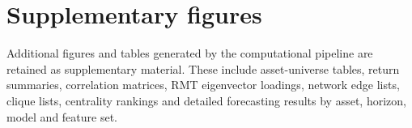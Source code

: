\section{Supplementary figures}
\label{app:supplementary_figures}


Additional figures and tables generated by the computational pipeline are retained as supplementary material. These include asset-universe tables, return summaries, correlation matrices, RMT eigenvector loadings, network edge lists, clique lists, centrality rankings and detailed forecasting results by asset, horizon, model and feature set.
